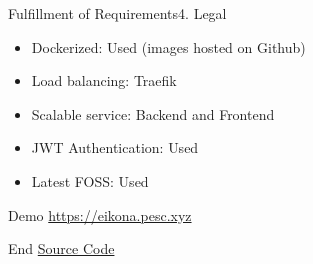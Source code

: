 \documentclass[aspectratio=169,20pt]{beamer}
\begin{document}
\begin{frame}{Fulfillment of Requirements}{4. Legal}
	\begin{itemize}
		\item{Dockerized: \textcolor{deepgreen}{Used (images hosted on Github)}}
		\item{Load balancing: \textcolor{deepgreen}{Traefik}}
		\item{Scalable service: \textcolor{deepgreen}{Backend and Frontend}}
		\item{JWT Authentication: \textcolor{deepgreen}{Used}}
		\item{Latest FOSS: \textcolor{deepgreen}{Used}}
	\end{itemize}
\end{frame}

\begin{frame}{Demo}{}
	\href{https://eikona.pesc.xyz/}{https://eikona.pesc.xyz}
\end{frame}

\begin{frame}{End}{}
	\href{https://github.com/eikona-org/eikona}{Source Code}
\end{frame}
\end{document}
